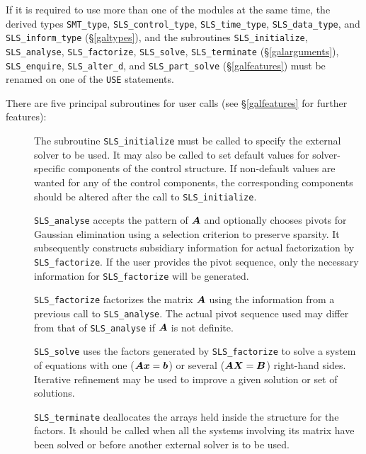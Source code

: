 \documentclass{galahad}
\newcommand{\packagename}{SLS}
\begin{document}


\noindent
If it is required to use more than one of the modules at the same time, 
the derived types
{\tt SMT\_type},
{\tt \packagename\_control\_type},
{\tt \packagename\_time\-\_type},
{\tt \packagename\_data\-\_type}, and
{\tt \packagename\_inform\_type}
(\S\ref{galtypes}),
and the subroutines
{\tt \packagename\_initialize},
{\tt \packagename\_analyse},
{\tt \packagename\-\_factorize},
{\tt \packagename\_solve},
{\tt \packagename\_terminate}
(\S\ref{galarguments}),
{\tt \packagename\_enquire},
{\tt \packagename\_alter\_d}, and
{\tt \packagename\_part\_solve}
(\S\ref{galfeatures})
must be renamed on one of the {\tt USE} statements.

\noindent There are five principal subroutines for user calls (see
\S\ref{galfeatures} for further features):

\begin{description}

\item[] The subroutine {\tt \packagename\_initialize} must be called to
specify the external solver to be used.
It may also be called to set default values
for solver-specific components of the control structure.
If non-default values are
wanted for any of the control components, the corresponding components
should be altered after the call to {\tt \packagename\_initialize}.

\item[] {\tt \packagename\_analyse} accepts the pattern of ${\bm{A}}$
 and optionally chooses pivots
 for Gaussian elimination using a selection criterion to preserve
 sparsity.  It subsequently constructs subsidiary information for
 actual factorization by {\tt \packagename\_factorize}. If the user provides
 the pivot sequence, only the necessary information for
 {\tt \packagename\_factorize} will be generated.

\item[] {\tt \packagename\_factorize} factorizes the matrix ${\bm{A}}$ using the
 information
 from a previous call to {\tt \packagename\_analyse}. The actual pivot sequence
 used may differ from that of {\tt \packagename\_analyse} if ${\bm{A}}$ is not
definite.

\item[] {\tt \packagename\_solve} uses the factors generated by
  {\tt \packagename\_factorize} to
  solve a system of equations with one (${\bm{A}} {\bm{x}} = {\bm{b}}$)
  or several (${\bm{A}} {\bm{X}} = {\bm{B}}$) right-hand sides.
  Iterative refinement may be used to improve a given solution
  or set of solutions.

\item[] {\tt \packagename\_terminate} deallocates the arrays held inside the
  structure for the factors. It should be called
  when all the systems involving its matrix have been solved
  or before another external solver is to be used.
\end{description}
\end{document}

